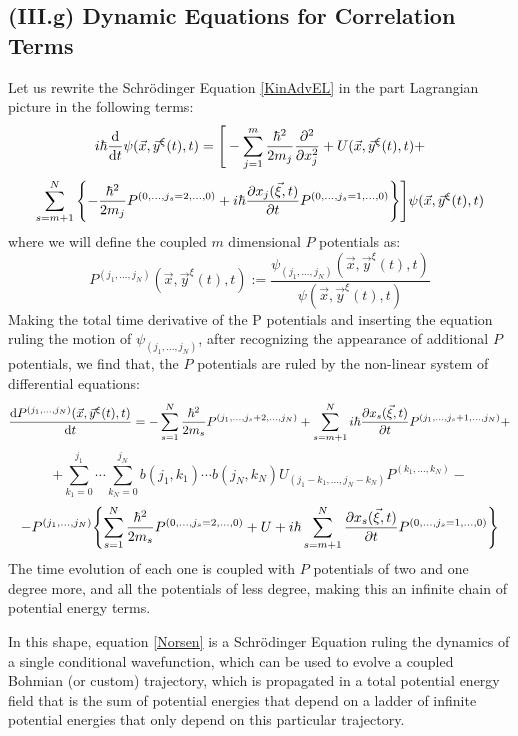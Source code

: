 \documentclass[11pt, a4paper]{article} %
\begin{document}
\subsection*{(III.g) Dynamic Equations for Correlation Terms}
Let us rewrite the Schrödinger Equation \eqref{KinAdvEL} in the part Lagrangian picture in the following terms:
\begin{equation}
i\hbar \dv{}{t}\psi(\vec{x},\vec{y}^\xi(t),t)=\Bigg[-\sum_{j=1}^m \frac{\hbar^2}{2m_j}\pdv[2]{}{x_j}+U(\vec{x},\vec{y}^\xi(t),t)+
\end{equation}
$$
\sum_{s=m+1}^N\qty{ -\frac{\hbar^2}{2m_j}P^{(0,...,j_s=2,...,0)}+i\hbar \pdv{x_j(\vec{\xi},t)}{t} P^{(0,...,j_s=1,...,0)} } \Bigg]\psi(\vec{x},\vec{y}^\xi(t),t)
$$
where we will define the coupled $m$ dimensional $P$ potentials as:
\begin{equation}\label{Norsen}
P^{(j_1,...,j_N)}(\vec{x},\vec{y}^\xi(t),t):=\frac{\psi_{(j_1,...,j_N)}(\vec{x},\vec{y}^\xi(t),t)}{\psi(\vec{x},\vec{y}^\xi(t),t)}
\end{equation}
Making the total time derivative of the P potentials and inserting the equation ruling the motion of $\psi_{(j_1,...,j_N)}$, after recognizing the appearance of additional $P$ potentials, we find that, the $P$ potentials are ruled by the non-linear system of differential equations:
\begin{equation}
\dv{P^{(j_1,...,j_N)}(\vec{x},\vec{y}^\xi(t),t)}{t}=-\sum_{s=1}^N\frac{\hbar^2}{2m_s}P^{(j_1,...,j_s+2,...,j_N)}+\sum_{s=m+1}^Ni\hbar \pdv{x_s(\vec{\xi},t)}{t} P^{(j_1,...,j_s+1,...,j_N)}+\vspace{-0.3cm}
\end{equation}
$$
+\sum_{k_1=0}^{j_1}\cdots\sum_{k_N=0}^{j_N} b(j_1,k_1)\cdots b(j_N,k_N)U_{(j_1-k_1,...,j_N-k_N)}P^{(k_1,...,k_N)}-
$$
$$
-P^{(j_1,...,j_N)}\qty{ \sum_{s=1}^N\frac{\hbar^2}{2m_s} P^{(0,...,j_s=2,...,0)}+U+i\hbar\sum_{s=m+1}^N \pdv{x_s(\vec{\xi},t)}{t}P^{(0,...,j_s=1,...,0)} }
$$
The time evolution of each one is coupled with $P$ potentials of two and one degree more, and all the potentials of less degree, making this an infinite chain of potential energy terms.

In this shape, equation \eqref{Norsen} is a Schrödinger Equation ruling the dynamics of a single conditional wavefunction, which can be used to evolve a coupled Bohmian (or custom) trajectory, which is propagated in a total potential energy field that is the sum of potential energies that depend on a ladder of infinite potential energies that only depend on this particular trajectory.
\end{document}
